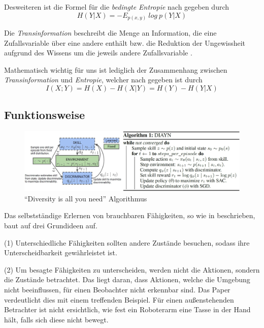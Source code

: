 Desweiteren ist die Formel für die \textit{bedingte Entropie} nach \cite{elements_cover} gegeben durch
\begin{equation}
    H(Y|X) = - E_{p(x,y)}\ log\ p(Y|X) \label{eq:condit_entropy}
\end{equation}

\smallspace

Die \textit{Transinformation} beschreibt die Menge an Information, die eine Zufallsvariable über eine andere enthält bzw. die Reduktion der Ungewissheit aufgrund des Wissens um die jeweils andere Zufallsvariable \cite{elements_cover}.

Mathematisch wichtig für uns ist lediglich der Zusammenhang zwischen \textit{Transinformation} und \textit{Entropie}, welcher nach \cite{elements_cover} gegeben ist durch
\begin{equation}
    I(X;Y) = H(X) - H(X|Y) = H(Y) - H(Y|X) \label{eq:trans_ent}
\end{equation}

\subsection{Funktionsweise}
\label{sec:diversity_howitworks}
\begin{figure}
\includegraphics[width=\textwidth, keepaspectratio=true]{images/algorithm_diayn.JPG}
\caption{``Diversity is all you need'' Algorithmus} \label{img:diayn}
\end{figure}
Das selbstständige Erlernen von brauchbaren Fähigkeiten, so wie in \cite{diversity_eysenbach} beschrieben, baut auf drei Grundideen auf.

\smallspace

(1) Unterschiedliche Fähigkeiten sollten andere Zustände besuchen, sodass ihre Unterscheidbarkeit gewährleistet ist.

(2) Um besagte Fähigkeiten zu unterscheiden, werden nicht die Aktionen, sondern die Zustände betrachtet. Das liegt daran, dass Aktionen, welche die Umgebung nicht beeinflussen, für einen Beobachter nicht erkennbar sind. Das Paper verdeutlicht dies mit einem treffenden Beispiel. Für einen außenstehenden Betrachter ist nicht ersichtlich, wie fest ein Roboterarm eine Tasse in der Hand hält, falls sich diese nicht bewegt.

